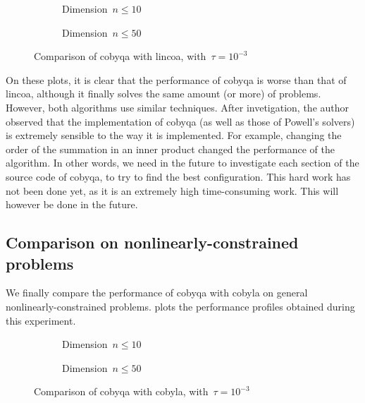 \begin{figure}[ht]
    \centering
    \begin{subfigure}[b]{0.49\textwidth}
        \centering
        \caption{Dimension~$n \le 10$}
    \end{subfigure}
    \hfill
    \begin{subfigure}[b]{0.49\textwidth}
        \centering
        \caption{Dimension~$n \le 50$}
    \end{subfigure}
    \caption{Comparison of \gls{cobyqa} with \gls{lincoa}, with~$\tau = 10^{-3}$}
    \label{fig:cobyqa-lincoa-linearly-constrained}
\end{figure}

On these plots, it is clear that the performance of \gls{cobyqa} is worse than that of \gls{lincoa}, although it finally solves the same amount (or more) of problems.
However, both algorithms use similar techniques.
After invetigation, the author observed that the implementation of \gls{cobyqa} (as well as those of Powell's solvers) is extremely sensible to the way it is implemented.
For example, changing the order of the summation in an inner product changed the performance of the algorithm.
In other words, we need in the future to investigate each section of the source code of \gls{cobyqa}, to try to find the best configuration.
This hard work has not been done yet, as it is an extremely high time-consuming work.
This will however be done in the future.

\subsection{Comparison on nonlinearly-constrained problems}

We finally compare the performance of \gls{cobyqa} with \gls{cobyla} on general nonlinearly-constrained problems.
 plots the performance profiles obtained during this experiment.

\begin{figure}[ht]
    \centering
    \begin{subfigure}[b]{0.49\textwidth}
        \centering
        \caption{Dimension~$n \le 10$}
    \end{subfigure}
    \hfill
    \begin{subfigure}[b]{0.49\textwidth}
        \centering
        \caption{Dimension~$n \le 50$}
    \end{subfigure}
    \caption{Comparison of \gls{cobyqa} with \gls{cobyla}, with~$\tau = 10^{-3}$}
    \label{fig:cobyqa-cobyla-nonlinearly-constrained}
\end{figure}

